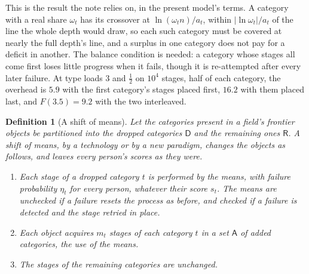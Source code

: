 \documentclass{article}
\newtheorem{definition}{Definition}
\begin{document}
This is the result the note relies on, in the present model's terms. A category with a real share $\omega_t$ has its crossover at $\ln(\omega_t n)/a_t$, within $|\ln\omega_t|/a_t$ of the line the whole depth would draw, so each such category must be covered at nearly the full depth's line, and a surplus in one category does not pay for a deficit in another. The balance condition is needed: a category whose stages all come first loses little progress when it fails, though it is re-attempted after every later failure. At type loads $3$ and $\tfrac12$ on $10^{4}$ stages, half of each category, the overhead is $5.9$ with the first category's stages placed first, $16.2$ with them placed last, and $F(3.5) = 9.2$ with the two interleaved.

\begin{definition}[A shift of means]\label{def:means}
Let the categories present in a field's frontier objects be partitioned into the \emph{dropped} categories $\mathsf{D}$ and the \emph{remaining} ones $\mathsf{R}$. A \emph{shift of means}, by a technology or by a new paradigm, changes the objects as follows, and leaves every person's scores as they were.
\begin{enumerate}
  \item[(a)] Each stage of a dropped category $t$ is performed by the means, with failure probability $\eta_t$ for every person, whatever their score $s_t$. The means are \emph{unchecked} if a failure resets the process as before, and \emph{checked} if a failure is detected and the stage retried in place.
  \item[(b)] Each object acquires $m_t$ stages of each category $t$ in a set $\mathsf{A}$ of \emph{added} categories, the use of the means.
  \item[(c)] The stages of the remaining categories are unchanged.
\end{enumerate}
\end{definition}
\end{document}
